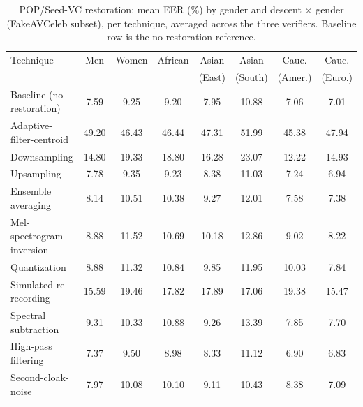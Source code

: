 \documentclass[11pt]{article}
\begin{document}
\begin{table}[H]
\centering
\caption{POP/Seed-VC restoration: mean EER (\%) by gender and descent
$\times$ gender (FakeAVCeleb subset), per technique, averaged across
the three verifiers. Baseline row is the no-restoration reference.}
\label{tab:restoration-pop-seedvc-demo}
\begin{tabular}{lccccccc}
\toprule
Technique & Men & Women & African & Asian & Asian & Cauc. & Cauc. \\
 & & & & (East) & (South) & (Amer.) & (Euro.) \\
\midrule
Baseline (no restoration) & 7.59 & 9.25 & 9.20 & 7.95 & 10.88 & 7.06 & 7.01 \\
Adaptive-filter-centroid & 49.20 & 46.43 & 46.44 & 47.31 & 51.99 & 45.38 & 47.94 \\
Downsampling & 14.80 & 19.33 & 18.80 & 16.28 & 23.07 & 12.22 & 14.93 \\
Upsampling & 7.78 & 9.35 & 9.23 & 8.38 & 11.03 & 7.24 & 6.94 \\
Ensemble averaging & 8.14 & 10.51 & 10.38 & 9.27 & 12.01 & 7.58 & 7.38 \\
Mel-spectrogram inversion & 8.88 & 11.52 & 10.69 & 10.18 & 12.86 & 9.02 & 8.22 \\
Quantization & 8.88 & 11.32 & 10.84 & 9.85 & 11.95 & 10.03 & 7.84 \\
Simulated re-recording & 15.59 & 19.46 & 17.82 & 17.89 & 17.06 & 19.38 & 15.47 \\
Spectral subtraction & 9.31 & 10.33 & 10.88 & 9.26 & 13.39 & 7.85 & 7.70 \\
High-pass filtering & 7.37 & 9.50 & 8.98 & 8.33 & 11.12 & 6.90 & 6.83 \\
Second-cloak-noise & 7.97 & 10.08 & 10.10 & 9.11 & 10.43 & 8.38 & 7.09 \\
\bottomrule
\end{tabular}
\end{table}
\end{document}
